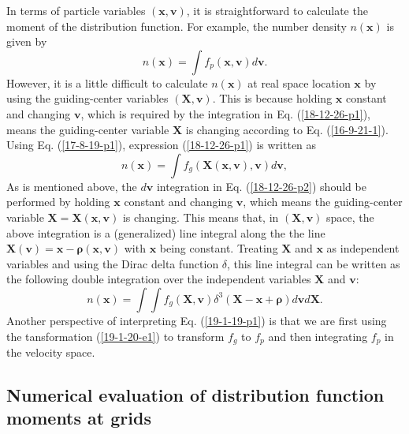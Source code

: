 \documentclass{llncs}
\newcommand{\tmmathbf}[1]{\ensuremath{\boldsymbol{#1}}}
\begin{document}
In terms of particle variables $(\mathbf{x}, \mathbf{v})$, it is
straightforward to calculate the moment of the distribution function. For
example, the number density $n (\mathbf{x})$ is given by
\begin{equation}
  \label{18-12-26-p1} n (\mathbf{x}) = \int f_p (\mathbf{x}, \mathbf{v})
  d\mathbf{v}.
\end{equation}
However, it is a little difficult to calculate $n (\mathbf{x})$ at real space
location $\mathbf{x}$ by using the guiding-center variables $(\mathbf{X},
\mathbf{v})$. This is because holding $\mathbf{x}$ constant and changing
$\mathbf{v}$, which is required by the integration in Eq. (\ref{18-12-26-p1}),
means the guiding-center variable $\mathbf{X}$ is changing according to Eq.
(\ref{16-9-21-1}). Using Eq. (\ref{17-8-19-p1}), expression
(\ref{18-12-26-p1}) is written as
\begin{equation}
  \label{18-12-26-p2} n (\mathbf{x}) = \int f_g (\mathbf{X} (\mathbf{x},
  \mathbf{v}), \mathbf{v}) d\mathbf{v},
\end{equation}
As is mentioned above, the $d\mathbf{v}$ integration in Eq.
(\ref{18-12-26-p2}) should be performed by holding $\mathbf{x}$ constant and
changing $\mathbf{v}$, which means the guiding-center variable
$\mathbf{X}=\mathbf{X} (\mathbf{x}, \mathbf{v})$ is changing. This means that,
in $(\mathbf{X}, \mathbf{v})$ space, the above integration is a (generalized)
line integral along the the line \ $\mathbf{X} (\mathbf{v})
=\mathbf{x}-\tmmathbf{\rho} (\mathbf{x}, \mathbf{v})$ with $\mathbf{x}$ being
constant. Treating $\mathbf{X}$ and $\mathbf{x}$ as independent variables and
using the Dirac delta function $\delta$, this line integral can be written as
the following double integration over the independent variables $\mathbf{X}$
and $\mathbf{v}$:
\begin{equation}
  \label{19-1-19-p1} n (\mathbf{x}) = \int \int f_g (\mathbf{X}, \mathbf{v})
  \delta^3 (\mathbf{X}-\mathbf{x}+\tmmathbf{\rho}) d\mathbf{v}d\mathbf{X}.
\end{equation}
Another perspective of interpreting Eq. (\ref{19-1-19-p1}) is that we are
first using the tansformation (\ref{19-1-20-e1}) to transform $f_g$ to $f_p$
and then integrating $f_p$ in the velocity space.

\subsection{Numerical evaluation of distribution function moments at grids}
\end{document}
